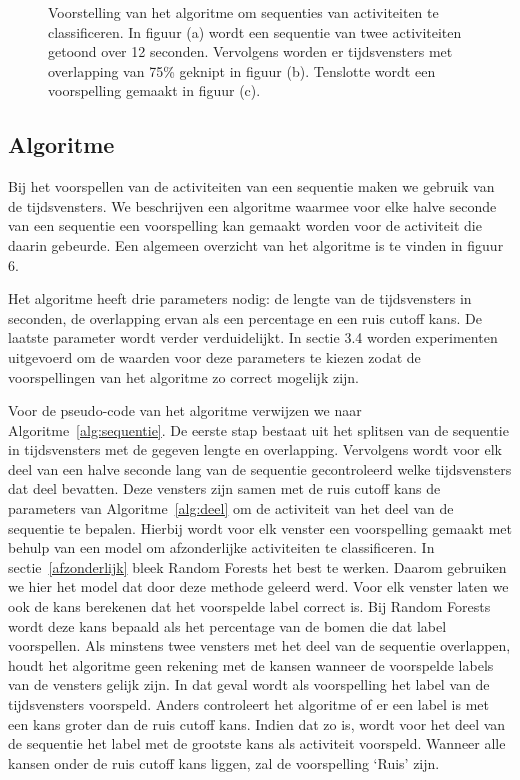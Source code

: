 \documentclass{article}
\begin{document}
\begin{figure}[h]
\begin{subfigure}[b]{.90\linewidth}
\end{subfigure}
  \caption{Voorstelling van het algoritme om sequenties van activiteiten te classificeren. In figuur (a) wordt een sequentie van twee activiteiten getoond over 12 seconden. Vervolgens worden er tijdsvensters met overlapping van 75\% geknipt in figuur (b). Tenslotte wordt een voorspelling gemaakt in figuur (c).}\label{fig:algoritme}

\end{figure}

\subsection{Algoritme}

Bij het voorspellen van de activiteiten van een sequentie maken we gebruik van de tijdsvensters. We beschrijven een algoritme waarmee voor elke halve seconde van een sequentie een voorspelling kan gemaakt worden voor de activiteit die daarin gebeurde. Een algemeen overzicht van het algoritme is te vinden in figuur 6.

Het algoritme heeft drie parameters nodig: de lengte van de tijdsvensters in seconden, de overlapping ervan als een percentage en een ruis cutoff kans. De laatste parameter wordt verder verduidelijkt. In sectie 3.4 worden experimenten uitgevoerd om de waarden voor deze parameters te kiezen zodat de voorspellingen van het algoritme zo correct mogelijk zijn.

Voor de pseudo-code van het algoritme verwijzen we naar Algoritme~\ref{alg:sequentie}. De eerste stap bestaat uit het splitsen van de sequentie in tijdsvensters met de gegeven lengte en overlapping. Vervolgens wordt voor elk deel van een halve seconde lang van de sequentie gecontroleerd welke tijdsvensters dat deel bevatten. Deze vensters zijn samen met de ruis cutoff kans de parameters van Algoritme~\ref{alg:deel} om de activiteit van het deel van de sequentie te bepalen. Hierbij wordt voor elk venster een voorspelling gemaakt met behulp van een model om afzonderlijke activiteiten te classificeren. In sectie~\ref{afzonderlijk} bleek Random Forests het best te werken. Daarom gebruiken we hier het model dat door deze methode geleerd werd. Voor elk venster laten we ook de kans berekenen dat het voorspelde label correct is. Bij Random Forests wordt deze kans bepaald als het percentage van de bomen die dat label voorspellen. %
Als minstens twee vensters met het deel van de sequentie overlappen, houdt het algoritme geen rekening met de kansen wanneer de voorspelde labels van de vensters gelijk zijn. In dat geval wordt als voorspelling het label van de tijdsvensters voorspeld. Anders controleert het algoritme of er een label is met een kans groter dan de ruis cutoff kans. Indien dat zo is, wordt voor het deel van de sequentie het label met de grootste kans als activiteit voorspeld. Wanneer alle kansen onder de ruis cutoff kans liggen, zal de voorspelling `Ruis' zijn.
\end{document}
